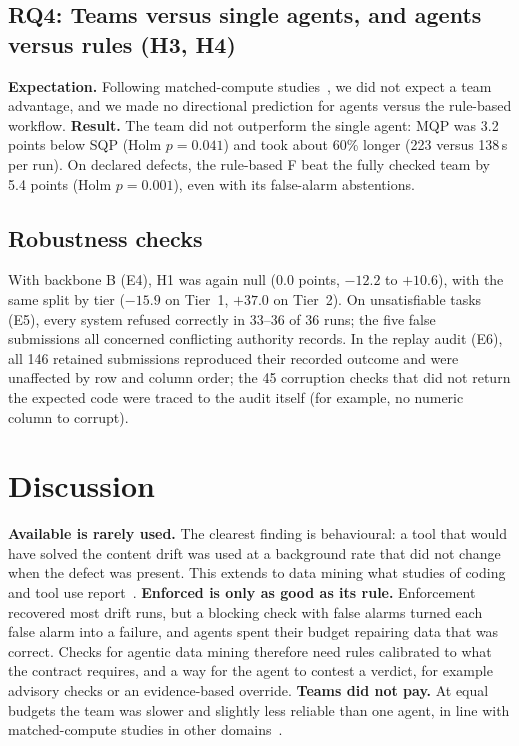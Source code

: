 \documentclass[conference]{IEEEtran}
\newcommand{\sys}[1]{\textsf{#1}}
\begin{document}
\subsection{RQ4: Teams versus single agents, and agents versus rules (H3, H4)}
\textbf{Expectation.} Following matched-compute studies~\cite{tran2026single,dylan2026equalcost}, we did not expect a
team advantage, and we made no directional prediction for agents versus the rule-based workflow.
\textbf{Result.} The team did not outperform the single agent: \sys{MQP} was 3.2 points below \sys{SQP} (Holm
$p=0.041$) and took about 60\% longer (223 versus 138\,s per run). On declared defects, the rule-based \sys{F} beat the
fully checked team by 5.4 points (Holm $p=0.001$), even with its false-alarm abstentions.

\subsection{Robustness checks}
With backbone B (E4), H1 was again null ($0.0$ points, $-12.2$ to $+10.6$), with the same split by tier ($-15.9$ on
Tier~1, $+37.0$ on Tier~2). On unsatisfiable tasks (E5), every system refused correctly in 33--36 of 36 runs; the five
false submissions all concerned conflicting authority records. In the replay audit (E6), all 146 retained submissions
reproduced their recorded outcome and were unaffected by row and column order; the 45 corruption checks that did not
return the expected code were traced to the audit itself (for example, no numeric column to corrupt).

\section{Discussion}
\label{sec:discussion}
\textbf{Available is rarely used.} The clearest finding is behavioural: a tool that would have solved the content
drift was used at a background rate that did not change when the defect was present. This extends to data mining what
studies of coding and tool use report~\cite{zhang2026rite,zhang2026rethinking}.
\textbf{Enforced is only as good as its rule.} Enforcement recovered most drift runs, but a blocking check with false
alarms turned each false alarm into a failure, and agents spent their budget repairing data that was correct. Checks
for agentic data mining therefore need rules calibrated to what the contract requires, and a way for the agent to
contest a verdict, for example advisory checks or an evidence-based override.
\textbf{Teams did not pay.} At equal budgets the team was slower and slightly less reliable than one agent, in line
with matched-compute studies in other domains~\cite{tran2026single,dylan2026equalcost}.
\end{document}
